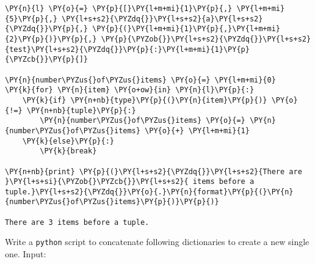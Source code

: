 \begin{Answer}
\begin{tcolorbox}[size=fbox, boxrule=1pt, colback=cellbackground, colframe=cellborder]
\begin{Verbatim}[commandchars=\\\{\}]
\PY{n}{l} \PY{o}{=} \PY{p}{[}\PY{l+m+mi}{1}\PY{p}{,} \PY{l+m+mi}{5}\PY{p}{,} \PY{l+s+s2}{\PYZdq{}}\PY{l+s+s2}{a}\PY{l+s+s2}{\PYZdq{}}\PY{p}{,} \PY{p}{(}\PY{l+m+mi}{1}\PY{p}{,}\PY{l+m+mi}{2}\PY{p}{)}\PY{p}{,} \PY{p}{\PYZob{}}\PY{l+s+s2}{\PYZdq{}}\PY{l+s+s2}{test}\PY{l+s+s2}{\PYZdq{}}\PY{p}{:}\PY{l+m+mi}{1}\PY{p}{\PYZcb{}}\PY{p}{]}

\PY{n}{number\PYZus{}of\PYZus{}items} \PY{o}{=} \PY{l+m+mi}{0}
\PY{k}{for} \PY{n}{item} \PY{o+ow}{in} \PY{n}{l}\PY{p}{:}
    \PY{k}{if} \PY{n+nb}{type}\PY{p}{(}\PY{n}{item}\PY{p}{)} \PY{o}{!=} \PY{n+nb}{tuple}\PY{p}{:}
        \PY{n}{number\PYZus{}of\PYZus{}items} \PY{o}{=} \PY{n}{number\PYZus{}of\PYZus{}items} \PY{o}{+} \PY{l+m+mi}{1}
    \PY{k}{else}\PY{p}{:}
        \PY{k}{break}
        
\PY{n+nb}{print} \PY{p}{(}\PY{l+s+s2}{\PYZdq{}}\PY{l+s+s2}{There are }\PY{l+s+si}{\PYZob{}\PYZcb{}}\PY{l+s+s2}{ items before a tuple.}\PY{l+s+s2}{\PYZdq{}}\PY{o}{.}\PY{n}{format}\PY{p}{(}\PY{n}{number\PYZus{}of\PYZus{}items}\PY{p}{)}\PY{p}{)}

There are 3 items before a tuple.
\end{Verbatim}
\end{tcolorbox}
\end{Answer}

\begin{Exercise}
Write a \texttt{python} script to concatenate following dictionaries to create a new single one.
Input:
\begin{Shaded}
\begin{Highlighting}[]
\OperatorTok{=}\NormalTok{\{}\NormalTok{:}\NormalTok{, }\NormalTok{:}\NormalTok{\}}
\OperatorTok{=}\NormalTok{\{}\NormalTok{:}\NormalTok{, }\NormalTok{:}\NormalTok{\}}
\OperatorTok{=}\NormalTok{\{}\NormalTok{:}\NormalTok{, }\NormalTok{:}\NormalTok{\}}
\end{Highlighting}
\end{Shaded}
\end{Exercise}

